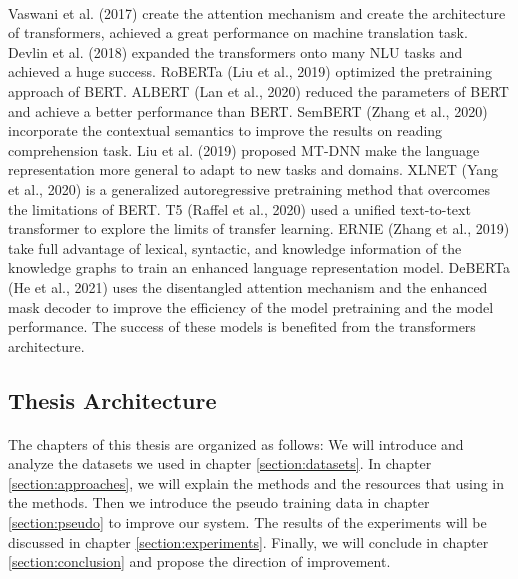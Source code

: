 \documentclass{article}
\begin{document}
\begin{CJK*}{UTF8}{bkai}
\paragraph{}
Vaswani et al. (2017)\cite{vaswani2017attention} create the attention mechanism and create the architecture of transformers, achieved a great performance on machine translation task. Devlin et al. (2018)\cite{devlin2018bert} expanded the transformers onto many NLU tasks and achieved a huge success. RoBERTa (Liu et al., 2019)\cite{liu2019roberta} optimized the pretraining approach of BERT. ALBERT (Lan et al., 2020)\cite{lan2020albert} reduced the parameters of BERT and achieve a better performance than BERT. SemBERT (Zhang et al., 2020)\cite{zhang2020sembert} incorporate the contextual semantics to improve the results on reading comprehension task. Liu et al. (2019)\cite{liu2019mtdnn} proposed MT-DNN make the language representation more general to adapt to new tasks and domains. XLNET (Yang et al., 2020)\cite{yang2020xlnet} is a generalized autoregressive pretraining method that overcomes the limitations of BERT. T5 (Raffel et al., 2020)\cite{raffel2020t5} used a unified text-to-text transformer to explore the limits of transfer learning. ERNIE (Zhang et al., 2019)\cite{zhang2019ernie} take full advantage of lexical, syntactic, and knowledge information of the knowledge graphs to train an enhanced language representation model. DeBERTa (He et al., 2021)\cite{he2021deberta} uses the disentangled attention mechanism and the enhanced mask decoder to improve the efficiency of the model pretraining and the model performance. The success of these models is benefited from the transformers architecture.

\subsection{Thesis Architecture}
\paragraph{}
The chapters of this thesis are organized as follows: We will introduce and analyze the datasets we used in chapter \ref{section:datasets}. In chapter \ref{section:approaches}, we will explain the methods and the resources that using in the methods. Then we introduce the pseudo training data in chapter \ref{section:pseudo} to improve our system. The results of the experiments will be discussed in chapter \ref{section:experiments}. Finally, we will conclude in chapter \ref{section:conclusion} and propose the direction of improvement.


\end{CJK*}
\end{document}
